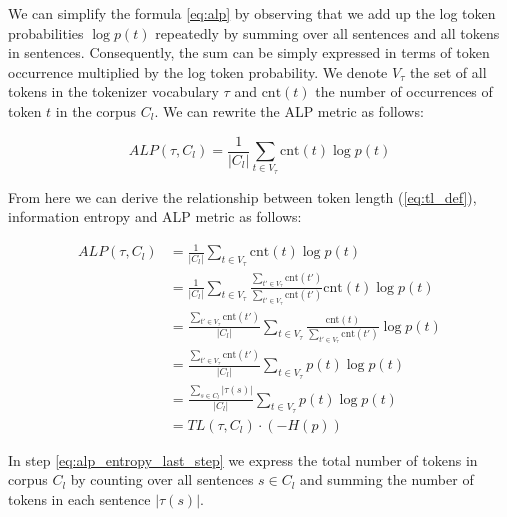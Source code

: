 We can simplify the formula \autoref{eq:alp} by observing that we add up the log token probabilities $\log p(t)$ repeatedly by summing over all sentences and all tokens in sentences. Consequently, the sum can be simply expressed in terms of token occurrence multiplied by the log token probability. We denote $V_\tau$ the set of all tokens in the tokenizer vocabulary $\tau$ and $\mathrm{cnt}(t)$ the number of occurrences of token $t$ in the corpus $C_l$. We can rewrite the ALP metric as follows:

\begin{equation}
    ALP(\tau, C_l) = \frac{1}{|C_l|} \sum_{t \in V_\tau} \mathrm{cnt}(t) \log p(t)
\end{equation}

From here we can derive the relationship between token length (\autoref{eq:tl_def}), information entropy and ALP metric as follows:

\begin{align}
ALP(\tau, C_l) &= \frac{1}{|C_l|} \sum_{t \in V_\tau} \mathrm{cnt}(t) \log p(t) \\
&= \frac{1}{|C_l|} \sum_{t \in V_\tau} \frac{\sum_{t' \in V_\tau} \mathrm{cnt}(t')}{\sum_{t' \in V_\tau} \mathrm{cnt}(t')} \mathrm{cnt}(t) \log p(t) \\
&= \frac{\sum_{t' \in V_\tau} \mathrm{cnt}(t')}{|C_l|} \sum_{t \in V_\tau} \frac{\mathrm{cnt}(t)}{\sum_{t' \in V_\tau} \mathrm{cnt}(t')} \log p(t) \\
&= \frac{\sum_{t' \in V_\tau} \mathrm{cnt}(t')}{|C_l|} \sum_{t \in V_\tau} p(t) \log p(t) \\
&= \frac{\sum_{s \in C_l}|\tau(s)|}{|C_l|} \sum_{t \in V_\tau} p(t) \log p(t) \label{eq:alp_entropy_last_step}\\
&= TL(\tau, C_l) \cdot (- H(p))
\end{align}

In step \ref{eq:alp_entropy_last_step} we express the total number of tokens in corpus $C_l$ by counting over all sentences $s \in C_l$ and summing the number of tokens in each sentence $|\tau(s)|$.


